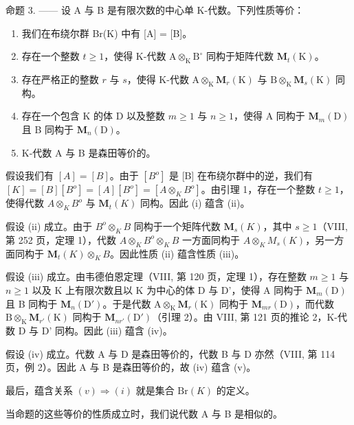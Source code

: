 命题 3. —— 设 A 与 B 是有限次数的中心单 K-代数。下列性质等价：

\begin{enumerate}
\def\labelenumi{(\roman{enumi})}
\item
  我们在布绕尔群 Br(K) 中有 {[}A{]} = {[}B{]}。
\item
  存在一个整数 \(t \geqslant 1\)，使得 K-代数 \(\mathrm{A} \otimes_{\mathrm{K}} \mathrm{B}^{\circ}\) 同构于矩阵代数 \(\mathbf{M}_t(\mathrm{K})\)。
\item
  存在严格正的整数 \(r\) 与 \(s\)，使得 K-代数 \(\mathrm{A} \otimes_{\mathrm{K}} \mathbf{M}_r(\mathrm{K})\) 与 \(\mathrm{B} \otimes_{\mathrm{K}} \mathbf{M}_s(\mathrm{K})\) 同构。
\item
  存在一个包含 K 的体 D 以及整数 \(m \geqslant 1\) 与 \(n \geqslant 1\)，使得 A 同构于 \(\mathbf{M}_{m}(\mathrm{D})\) 且 B 同构于 \(\mathbf{M}_{n}(\mathrm{D})\)。
\item
  K-代数 A 与 B 是森田等价的。
\end{enumerate}

假设我们有 \([A]=[B]\)。由于 \([B^{o}]\) 是 {[}B{]} 在布绕尔群中的逆，我们有 \([K]=[B][B^{o}]=[A][B^{o}]=[A\otimes_{K}B^{o}]\)。由引理 1，存在一个整数 \(t\geqslant1\)，使得代数 \(A\otimes_{K}B^{o}\) 与 \(\mathbf{M}_{t}(K)\) 同构。因此 (i) 蕴含 (ii)。

假设 (ii) 成立。由于 \(B^{o} \otimes_{K} B\) 同构于一个矩阵代数 \(\mathbf{M}_{s}(K)\)，其中 \(s \geqslant 1\)（VIII, 第 252 页，定理 1），代数 \(A \otimes_{K} B^{o} \otimes_{K} B\) 一方面同构于 \(A \otimes_{K} M_{s}(K)\)，另一方面同构于 \(\mathbf{M}_{t}(K) \otimes_{K} B\)。因此性质 (ii) 蕴含性质 (iii)。

假设 (iii) 成立。由韦德伯恩定理（VIII, 第 120 页，定理 1），存在整数 \(m \geqslant 1\) 与 \(n \geqslant 1\) 以及 K 上有限次数且以 K 为中心的体 D 与 D'，使得 A 同构于 \(\mathbf{M}_m(\mathrm{D})\) 且 B 同构于 \(\mathbf{M}_n(\mathrm{D}')\)。于是代数 \(\mathrm{A} \otimes_{\mathrm{K}} \mathbf{M}_r(\mathrm{K})\) 同构于 \(\mathbf{M}_{mr}(\mathrm{D})\)，而代数 \(\mathrm{B} \otimes_{\mathrm{K}} \mathbf{M}_{r'}(\mathrm{K})\) 同构于 \(\mathbf{M}_{nr'}(\mathrm{D}')\)（引理 2）。由 VIII, 第 121 页的推论 2，K-代数 D 与 D' 同构。因此 (iii) 蕴含 (iv)。

假设 (iv) 成立。代数 A 与 D 是森田等价的，代数 B 与 D 亦然（VIII, 第 114 页，例 2）。因此 A 与 B 是森田等价的，故 (iv) 蕴含 (v)。

最后，蕴含关系 \((v)\Rightarrow(i)\) 就是集合 \(\mathrm{Br}(K)\) 的定义。

当命题的这些等价的性质成立时，我们说代数 A 与 B 是相似的。

